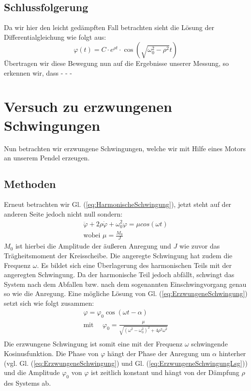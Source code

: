\documentclass[11pt,a4paper,titlepage, ngerman]{article}
\newcommand{\refeq}[1]{Gl. (\ref{eq:#1})}
\begin{document}
		\subsection*{Schlussfolgerung}
			
			Da wir hier den leicht gedämpften Fall betrachten sieht die Lösung der Differentialgleichung wie folgt aus:
			\begin{equation}
				\varphi (t)=C\cdot e^{\rho t}\cdot \cos{(\sqrt{\omega_0^2-\rho^2}t)}
			\end{equation}
			Übertragen wir diese Bewegung nun auf die Ergebnisse unserer Messung, so erkennen wir, dass - - - %
			
	\section{Versuch zu erzwungenen Schwingungen}
	
		Nun betrachten wir erzwungene Schwingungen, welche wir mit Hilfe eines Motors an unserem Pendel erzeugen.
			
		\subsection*{Methoden}
			
			Erneut betrachten wir \refeq{HarmonischeSchwingung}, jetzt steht auf der anderen Seite jedoch nicht null sondern:
			\begin{align}
				\ddot{\varphi}+2\rho\dot{\varphi}+\omega_0^2\varphi= \mu cos(\omega t) \label{eq:ErzwungeneSchwingung}\\
				\text{wobei } \mu = \frac{M_0}{J}
			\end{align}
			$M_0$ ist hierbei die Amplitude der äußeren Anregung und $J$ wie zuvor das Trägheitsmoment der Kreisscheibe. Die angeregte Schwingung hat zudem die Frequenz $\omega$.
			Es bildet sich eine Überlagerung des harmonischen Teils mit der angeregten Schwingung. Da der harmonische Teil jedoch abfällt, schwingt das System nach dem Abfallen bzw. nach dem sogenannten Einschwingvorgang genau so wie die Anregung.
			Eine mögliche Lösung von \refeq{ErzwungeneSchwingung} setzt sich wie folgt zusammen:
			\begin{align}
				\varphi = \varphi_0 \cos{(\omega t-\alpha)} \label{eq:ErzwungeneSchwingungLsg}\\
				\text{mit } \quad \varphi_0 = \frac{\mu}{\sqrt{(\omega^2-\omega_0^2)^2+4\rho^2\omega^2}} \label{eq:ErzwungeneSchwingungAmp}\\
			\end{align}
			Die erzwungene Schwingung ist somit eine mit der Frequenz $\omega$ schwingende Kosinusfunktion. Die Phase von $\varphi$ hängt der Phase der Anregung um $\alpha$ hinterher (vgl. \refeq{ErzwungeneSchwingung} und \refeq{ErzwungeneSchwingungLsg}) und die Amplitude $\varphi_0$ von $\varphi$ ist zeitlich konstant und hängt von der Dämpfung $\rho$ des Systems ab.
			
\end{document}
